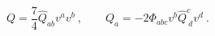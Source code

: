 \begin{equation}
  \label{eq:whocares}
  Q= \frac74 \hat Q_{ab}v^a v^b\ , \qquad Q_a= -2 \Phi_{abc}v^b \hat
  Q^c_{\ d}v^d\ .
\end{equation}

